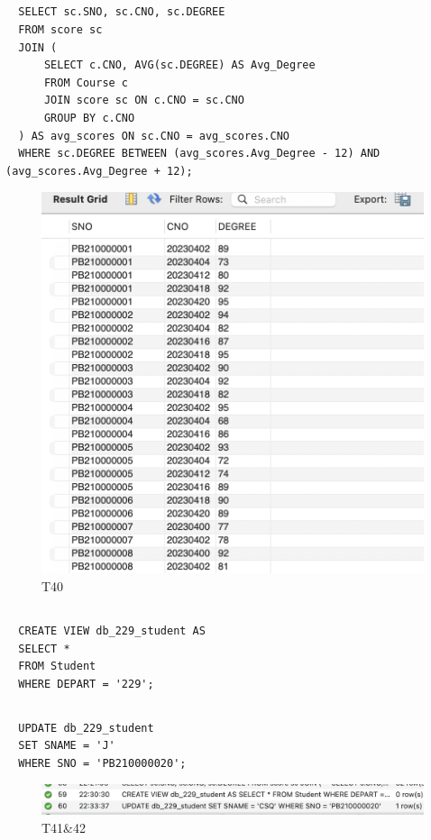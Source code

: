 \documentclass[UTF8]{ctexart}
\begin{document}
\subsection{}
\begin{lstlisting}
  SELECT sc.SNO, sc.CNO, sc.DEGREE
  FROM score sc
  JOIN (
      SELECT c.CNO, AVG(sc.DEGREE) AS Avg_Degree
      FROM Course c
      JOIN score sc ON c.CNO = sc.CNO
      GROUP BY c.CNO
  ) AS avg_scores ON sc.CNO = avg_scores.CNO
  WHERE sc.DEGREE BETWEEN (avg_scores.Avg_Degree - 12) AND (avg_scores.Avg_Degree + 12);  
\end{lstlisting}
\begin{figure}[H]
  \centering
  \includegraphics[scale=0.7]{pics/40.png}
  \caption*{T40}
\end{figure}

\subsection{}
\begin{lstlisting}
  CREATE VIEW db_229_student AS
  SELECT *
  FROM Student
  WHERE DEPART = '229'; 
\end{lstlisting}

\subsection{}
\begin{lstlisting}
  UPDATE db_229_student
  SET SNAME = 'J'
  WHERE SNO = 'PB210000020';  
\end{lstlisting}
\begin{figure}[H]
  \centering
  \includegraphics[scale=0.7]{pics/41-42.png}
  \caption*{T41\&42}
\end{figure}
\end{document}
